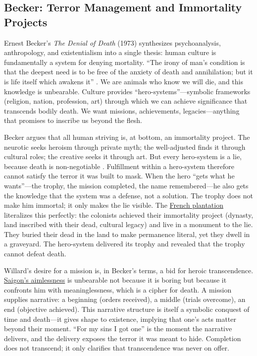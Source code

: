 \subsection*{Becker: Terror Management and Immortality Projects}
\label{ssec:vi-becker}

Ernest Becker's \textit{The Denial of Death} (1973) synthesizes psychoanalysis, anthropology,
and existentialism into a single thesis: human culture is fundamentally a system for denying
mortality. ``The irony of man's condition is that the deepest need is to be free of the
anxiety of death and annihilation; but it is life itself which awakens it''
\parencite[p.~66]{BeckerDenial1973}. We are animals who know we will die, and this knowledge
is unbearable. Culture provides ``hero-systems''---symbolic frameworks (religion, nation,
profession, art) through which we can achieve significance that transcends bodily death. We
want missions, achievements, legacies---anything that promises to inscribe us beyond the flesh.

Becker argues that all human striving is, at bottom, an immortality project. The neurotic
seeks heroism through private myth; the well-adjusted finds it through cultural roles; the
creative seeks it through art. But every hero-system is a lie, because death is non-negotiable
\parencite[pp.~26--27]{BeckerDenial1973}. Fulfillment within a hero-system therefore cannot
satisfy the terror it was built to mask. When the hero ``gets what he wants''---the trophy,
the mission completed, the name remembered---he also gets the knowledge that the system was a
defense, not a solution. The trophy does not make him immortal; it only makes the lie visible.
The \hyperref[scene:french-plantation]{French plantation} literalizes this perfectly: the
colonists achieved their immortality project (dynasty, land inscribed with their dead, cultural
legacy) and live in a monument to the lie. They buried their dead in the land to make
permanence literal, yet they dwell in a graveyard. The hero-system delivered its trophy and
revealed that the trophy cannot defeat death.

Willard's desire for a mission is, in Becker's terms, a bid for heroic transcendence.
\hyperref[scene:saigon-opening]{Saigon's aimlessness} is unbearable not because it is boring
but because it confronts him with meaninglessness, which is a cipher for death. A mission
supplies narrative: a beginning
(orders received), a middle (trials overcome), an end (objective achieved). This narrative
structure is itself a symbolic conquest of time and death---it gives shape to existence,
implying that one's acts matter beyond their moment. ``For my sins I got one'' is the moment
the narrative delivers, and the delivery exposes the terror it was meant to hide. Completion
does not transcend; it only clarifies that transcendence was never on offer.


